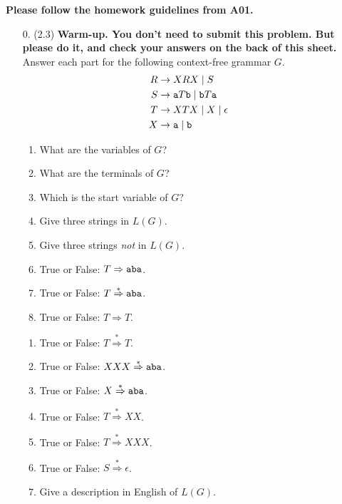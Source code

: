 \documentclass[11pt]{article}
\begin{document}
\assignmentnametitlestuff


\if{}
{\bf Please follow the homework guidelines from A01.}

\fi


\begin{enumerate}

\item[0.] (2.3) {\bf Warm-up. You don't need to submit this problem. But please do it, and check your answers on the back of this sheet.}
Answer each part for the following context-free grammar $G$.
\begin{align*}
R &\to XRX \mid S \cr
S &\to {\tt a}T{\tt b} \mid {\tt b}T{\tt a} \cr
T &\to XTX \mid X \mid \epsilon \cr
X &\to {\tt a} \mid {\tt b}
\end{align*}

\begin{minipage}{.5\linewidth}
\begin{enumerate}
\item What are the variables of $G$?
\item What are the terminals of $G$?
\item Which is the start variable of $G$?
\item Give three strings in $L(G)$.
\item Give three strings {\em not} in $L(G)$.
\item True or False: $T \Rightarrow {\tt aba}$.
\item True or False: $T \stackrel{*}{\Rightarrow} {\tt aba}$.
\item True or False: $T \Rightarrow T$.
\setcounter{parts}{\value{enumii}}
\end{enumerate}
\end{minipage}
\begin{minipage}{.5\linewidth}
\begin{enumerate}
\setcounter{enumii}{\value{parts}}
\item True or False: $T \stackrel{*}{\Rightarrow} T$.
\item True or False: $XXX \stackrel{*}{\Rightarrow} {\tt aba}$.
\item True or False: $X \stackrel{*}{\Rightarrow} {\tt aba}$.
\item True or False: $T \stackrel{*}{\Rightarrow} XX$.
\item True or False: $T \stackrel{*}{\Rightarrow} XXX$.
\item True or False: $S \stackrel{*}{\Rightarrow} \epsilon$.
\item Give a description in English of $L(G)$.
\end{enumerate}
\end{minipage}


\end{enumerate}
\end{document}
